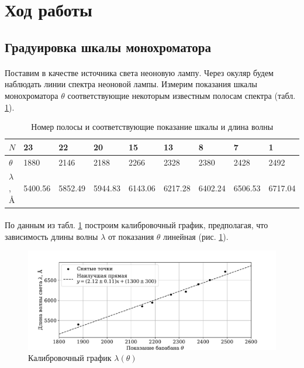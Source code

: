\documentclass[a4paper,12pt]{article}
\begin{document}
\section{Ход работы}

\subsection{Градуировка шкалы монохроматора}

\paragraph{} Поставим в качестве источника света неоновую лампу. Через окуляр будем наблюдать линии спектра неоновой лампы. Измерим показания шкалы монохроматора $\theta$ соответствующие некоторым известным полосам спектра (табл. \ref{tab:calib}).

\begin{table}[h]
\centering
\begin{tabular}{|l|l|l|l|l|l|l|l|l|}
\hline
$N$          & 23      & 22      & 20      & 15      & 13      & 8       & 7       & 1       \\ \hline
$\theta$     & 1880    & 2146    & 2188    & 2266    & 2328    & 2380    & 2428    & 2492    \\ \hline
$\lambda$, Å & 5400.56 & 5852.49 & 5944.83 & 6143.06 & 6217.28 & 6402.24 & 6506.53 & 6717.04 \\ \hline
\end{tabular}
\caption{Номер полосы и соответствующие показание шкалы и длина волны}
\label{tab:calib}
\end{table}

\paragraph{} По данным из табл. \ref{tab:calib} построим калибровочный график, предполагая, что зависимость длины волны $\lambda$ от показания $\theta$ линейная (рис. \ref{fig:calib}).

\begin{figure}[h]
\centering
\includegraphics[width=\textwidth]{plot_calib.pdf}
\caption{Калибровочный график $\lambda(\theta)$}
\label{fig:calib}
\end{figure}
\end{document}
